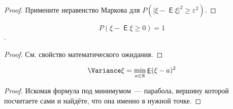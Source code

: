 \documentclass{article}
\DeclareMathOperator{\Expected}{\mathsf{E}}
\begin{document}
    \begin{proof}
        Примените неравенство Маркова для $P(|\xi-\Expected\xi|^2\geqslant\varepsilon^2)$.
    \end{proof}
    \begin{property}
        $$P(\xi-\Expected\xi\geqslant0)=1$$.
    \end{property}
    \begin{proof}
        См. свойство математического ожидания.
    \end{proof}
    \begin{property}
        $$\Variance\xi=\min\limits_{a\in\mathbb R}\Expected(\xi-a)^2$$
    \end{property}
    \begin{proof}
        Искомая формула под минимумом~--- парабола, вершину которой посчитаете сами и найдёте, что она именно в нужной точке.
    \end{proof}
\end{document}

